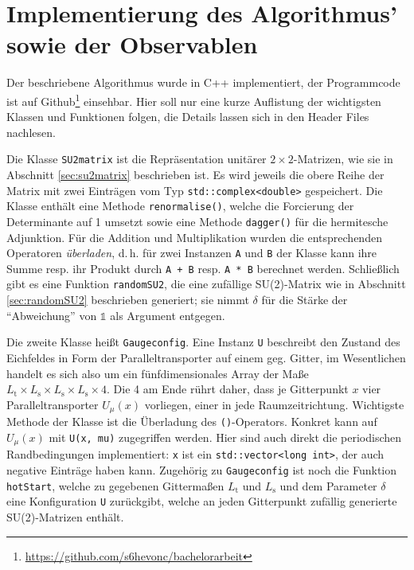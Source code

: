 \section{Implementierung des Algorithmus' sowie der Observablen}
Der beschriebene Algorithmus wurde in C++ implementiert, der Programmcode ist auf
Github\footnote{\url{https://github.com/s6hevonc/bachelorarbeit}} einsehbar. Hier soll nur eine kurze Auflistung der wichtigsten Klassen
und Funktionen folgen, die Details lassen sich in den Header Files nachlesen.

Die Klasse \texttt{SU2matrix} ist die Repräsentation unitärer $2 \times 2$-Matrizen,
wie sie in Abschnitt \ref{sec:su2matrix} beschrieben ist. Es wird jeweils die obere
Reihe der Matrix mit zwei Einträgen vom Typ \texttt{std::complex<double>} gespeichert.
Die Klasse enthält eine Methode \texttt{renormalise()}, welche die Forcierung der
Determinante auf 1 umsetzt sowie eine Methode \texttt{dagger()} für die hermitesche
Adjunktion. Für die Addition und Multiplikation wurden die entsprechenden Operatoren
\emph{überladen}, d.\,h. für zwei Instanzen \texttt{A} und \texttt{B} der Klasse kann 
ihre Summe resp. ihr Produkt durch \texttt{A + B} resp. \texttt{A * B} berechnet
werden. Schließlich gibt es eine Funktion \texttt{randomSU2}, die eine zufällige
SU(2)-Matrix wie in Abschnitt \ref{sec:randomSU2} beschrieben generiert; sie nimmt
$\delta$ für die Stärke der \enquote{Abweichung} von $\mathds{1}$ als Argument entgegen.

Die zweite Klasse heißt \texttt{Gaugeconfig}. Eine Instanz \texttt{U} beschreibt den
Zustand des Eichfeldes in Form der Paralleltransporter auf einem geg. Gitter, im
Wesentlichen handelt es sich also um ein fünfdimensionales Array der Maße
$L_\text{t} \times L_\text{s} \times L_\text{s} \times L_\text{s} \times 4$.
Die 4 am Ende rührt daher, dass je Gitterpunkt $x$ vier Paralleltransporter
$U_\mu(x)$ vorliegen, einer in jede Raumzeitrichtung. Wichtigste Methode der Klasse
ist die Überladung des \texttt{()}-Operators. Konkret kann auf $U_\mu(x)$ mit
\texttt{U(x, mu)} zugegriffen werden. Hier sind auch direkt die periodischen
Randbedingungen implementiert: \texttt{x} ist ein \texttt{std::vector<long int>},
der auch negative Einträge haben kann. Zugehörig zu \texttt{Gaugeconfig} ist noch
die Funktion \texttt{hotStart}, welche zu gegebenen Gittermaßen $L_\text{t}$ und
$L_\text{s}$ und dem Parameter $\delta$ eine Konfiguration \texttt{U} zurückgibt,
welche an jeden Gitterpunkt zufällig generierte SU(2)-Matrizen enthält.

